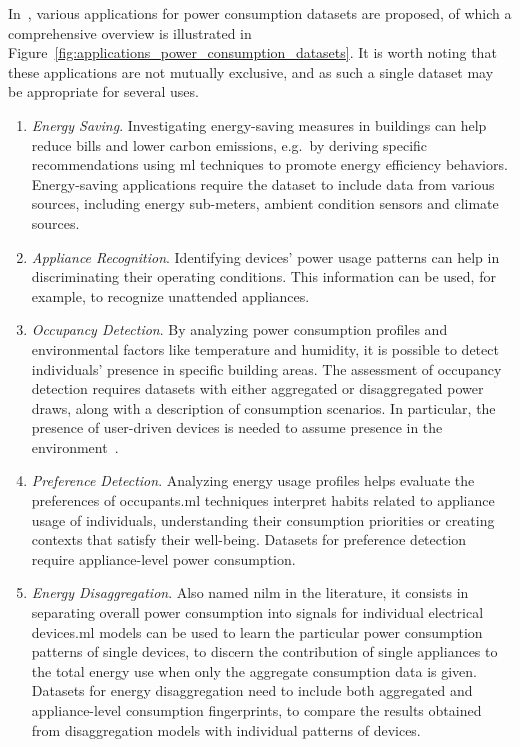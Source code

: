 In~\parencite{himeurBuildingPowerConsumption2020}, various applications for power consumption datasets are proposed, of which a comprehensive overview is illustrated in Figure~\ref{fig:applications_power_consumption_datasets}. It is worth noting that these applications are not mutually exclusive, and as such a single dataset may be appropriate for several uses. 
\begin{enumerate}[label={\textit{A\arabic*.}}, leftmargin=3.5em]
    \item \textit{Energy Saving}. Investigating energy-saving measures in buildings can help reduce bills and lower carbon emissions, e.g.\ by deriving specific recommendations using \acrfull{ml} techniques to promote energy efficiency behaviors. Energy-saving applications require the dataset to include data from various sources, including energy sub-meters, ambient condition sensors and climate sources.

    \item \textit{Appliance Recognition}. Identifying devices' power usage patterns can help in discriminating their operating conditions. This information can be used, for example, to recognize unattended appliances.

    \item \textit{Occupancy Detection}. By analyzing power consumption profiles and environmental factors like temperature and humidity, it is possible to detect individuals' presence in specific building areas. The assessment of occupancy detection requires datasets with either aggregated or disaggregated power draws, along with a description of consumption scenarios. In particular, the presence of user-driven devices is needed to assume presence in the environment~\parencite{monacchiGREENDEnergyConsumption2014}.

    \item \textit{Preference Detection}. Analyzing energy usage profiles helps evaluate the preferences of occupants.\@ \acrshort{ml} techniques interpret habits related to appliance usage of individuals, understanding their consumption priorities or creating contexts that satisfy their well-being. Datasets for preference detection require appliance-level power consumption.

    \item \textit{Energy Disaggregation}. Also named \acrfull{nilm} in the literature, it consists in separating overall power consumption into signals for individual electrical devices.\@ \acrshort{ml} models can be used to learn the particular power consumption patterns of single devices, to discern the contribution of single appliances to the total energy use when only the aggregate consumption data is given. Datasets for energy disaggregation need to include both aggregated and appliance-level consumption fingerprints, to compare the results obtained from disaggregation models with individual patterns of devices.


\end{enumerate}
